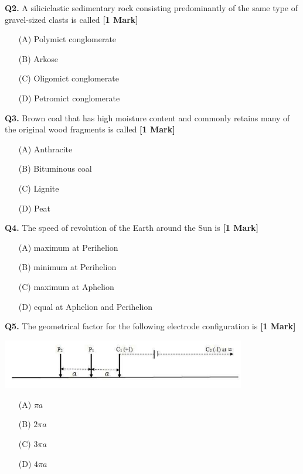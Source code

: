 \documentclass[11pt]{article}
\newcommand{\questiona}[2]{
    \noindent\textbf{Q#2.} #1 \hfill \textbf{[1 Mark]}
}
\begin{document}
\questiona{A siliciclastic sedimentary rock consisting predominantly of the same type of gravel-sized clasts is called}{2}
\begin{enumerate}
    \item[(A)] Polymict conglomerate
    \item[(B)] Arkose
    \item[(C)] Oligomict conglomerate
    \item[(D)] Petromict conglomerate
\end{enumerate}
\vspace{0.5cm}

\questiona{Brown coal that has high moisture content and commonly retains many of the original wood fragments is called}{3}
\begin{enumerate}
    \item[(A)] Anthracite
    \item[(B)] Bituminous coal
    \item[(C)] Lignite
    \item[(D)] Peat
\end{enumerate}
\vspace{0.5cm}

\questiona{The speed of revolution of the Earth around the Sun is}{4}
\begin{enumerate}
    \item[(A)] maximum at Perihelion
    \item[(B)] minimum at Perihelion
    \item[(C)] maximum at Aphelion
    \item[(D)] equal at Aphelion and Perihelion
\end{enumerate}
\vspace{0.5cm}

\questiona{The geometrical factor for the following electrode configuration is}{5}
\begin{center}
\includegraphics[width=0.8\textwidth]{figures/5.png}
\end{center}
\begin{enumerate}
    \item[(A)] \( \pi a \)
    \item[(B)] \( 2\pi a \)
    \item[(C)] \( 3\pi a \)
    \item[(D)] \( 4\pi a \)
\end{enumerate}
\vspace{0.5cm}
\end{document}
